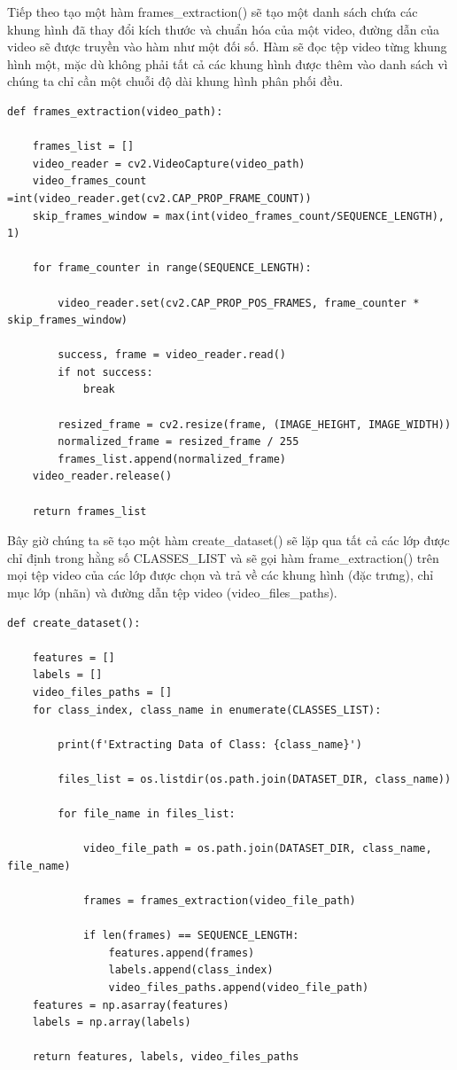  Tiếp theo tạo một hàm frames\_extraction() sẽ tạo một danh sách chứa các khung hình đã thay đổi kích thước và chuẩn hóa của một video, đường dẫn của video sẽ được truyền vào hàm như một đối số. Hàm sẽ đọc tệp video từng khung hình một, mặc dù không phải tất cả các khung hình được thêm vào danh sách vì chúng ta chỉ cần một chuỗi độ dài khung hình phân phối đều. 

\begin{lstlisting}[style=codePython]
def frames_extraction(video_path):

    frames_list = []
    video_reader = cv2.VideoCapture(video_path)
    video_frames_count =int(video_reader.get(cv2.CAP_PROP_FRAME_COUNT))
    skip_frames_window = max(int(video_frames_count/SEQUENCE_LENGTH), 1)

    for frame_counter in range(SEQUENCE_LENGTH):

        video_reader.set(cv2.CAP_PROP_POS_FRAMES, frame_counter * skip_frames_window)
        
        success, frame = video_reader.read()
        if not success:
            break

        resized_frame = cv2.resize(frame, (IMAGE_HEIGHT, IMAGE_WIDTH))
        normalized_frame = resized_frame / 255
        frames_list.append(normalized_frame)
    video_reader.release()

    return frames_list
\end{lstlisting}

Bây giờ chúng ta sẽ tạo một hàm create\_dataset() sẽ lặp qua tất cả các lớp được chỉ định trong hằng số CLASSES\_LIST và sẽ gọi hàm frame\_extraction() trên mọi tệp video của các lớp được chọn và trả về các khung hình (đặc trưng), chỉ mục lớp (nhãn) và đường dẫn tệp video (video\_files\_paths).

\begin{lstlisting}[style=codePython]
def create_dataset():

    features = []
    labels = []
    video_files_paths = []
    for class_index, class_name in enumerate(CLASSES_LIST):

        print(f'Extracting Data of Class: {class_name}')

        files_list = os.listdir(os.path.join(DATASET_DIR, class_name))

        for file_name in files_list:

            video_file_path = os.path.join(DATASET_DIR, class_name, file_name)

            frames = frames_extraction(video_file_path)

            if len(frames) == SEQUENCE_LENGTH:
                features.append(frames)
                labels.append(class_index)
                video_files_paths.append(video_file_path)
    features = np.asarray(features)
    labels = np.array(labels)

    return features, labels, video_files_paths
\end{lstlisting} 

